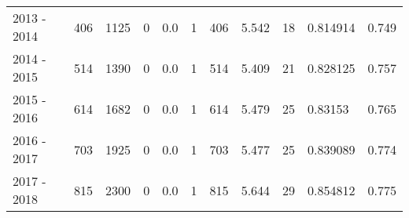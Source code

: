 \begin{tabular}{lrrrrrrrllr}
2013 - 2014 &      406 &     1125 &                 0 &               0.0 &                       1 &                        406 &       5.542 &            18 &   0.814914 &             0.749 \\
2014 - 2015 &      514 &     1390 &                 0 &               0.0 &                       1 &                        514 &       5.409 &            21 &   0.828125 &             0.757 \\
2015 - 2016 &      614 &     1682 &                 0 &               0.0 &                       1 &                        614 &       5.479 &            25 &    0.83153 &             0.765 \\
2016 - 2017 &      703 &     1925 &                 0 &               0.0 &                       1 &                        703 &       5.477 &            25 &   0.839089 &             0.774 \\
2017 - 2018 &      815 &     2300 &                 0 &               0.0 &                       1 &                        815 &       5.644 &            29 &   0.854812 &             0.775 \\
\bottomrule
\end{tabular}
